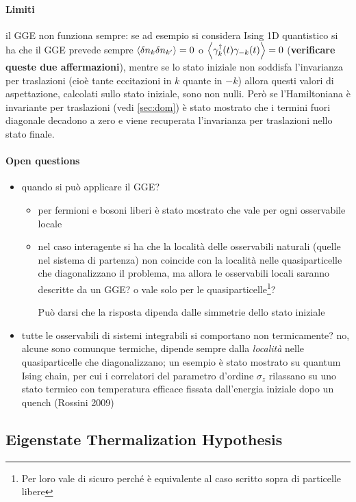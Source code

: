 \documentclass[a4paper,10pt,twocolumn]{article}
\begin{document}
\paragraph{Limiti} il GGE non funziona sempre: se ad esempio si considera Ising 1D quantistico si ha che il GGE prevede sempre $\expval{\delta n_k \delta n_{k'}} = 0$ o $\expval{\gamma_k^\dagger(t) \gamma_{-k} (t)} = 0$ (\textbf{verificare queste due affermazioni}), mentre se lo stato iniziale non soddisfa l'invarianza per traslazioni (cioè tante eccitazioni in $k$ quante in $-k$) allora questi valori di aspettazione, calcolati sullo stato iniziale, sono non nulli. Però se l'Hamiltoniana è invariante per traslazioni (vedi \cref{sec:dom}) è stato mostrato che i termini fuori diagonale decadono a zero e viene recuperata l'invarianza per traslazioni nello stato finale.

\paragraph{Open questions}
\begin{itemize}
	\item quando si può applicare il GGE?
	\begin{itemize}
		\item per fermioni e bosoni liberi è stato mostrato che vale per ogni osservabile locale
		\item nel caso interagente si ha che la località delle osservabili naturali (quelle nel sistema di partenza) non coincide con la località nelle quasiparticelle che diagonalizzano il problema, ma allora le osservabili locali saranno descritte da un GGE? o vale solo per le quasiparticelle\footnote{Per loro vale di sicuro perché è equivalente al caso scritto sopra di particelle libere}?
		
		Può darsi che la risposta dipenda dalle simmetrie dello stato iniziale
	\end{itemize}
	\item tutte le osservabili di sistemi integrabili si comportano non termicamente? no, alcune sono comunque termiche, dipende sempre dalla \emph{località} nelle quasiparticelle che diagonalizzano; un esempio è stato mostrato su quantum Ising chain, per cui i correlatori del parametro d'ordine $\sigma_z$ rilassano su uno stato termico con temperatura efficace fissata dall'energia iniziale dopo un quench (Rossini 2009)
\end{itemize}

\subsection{Eigenstate Thermalization Hypothesis}
\end{document}

